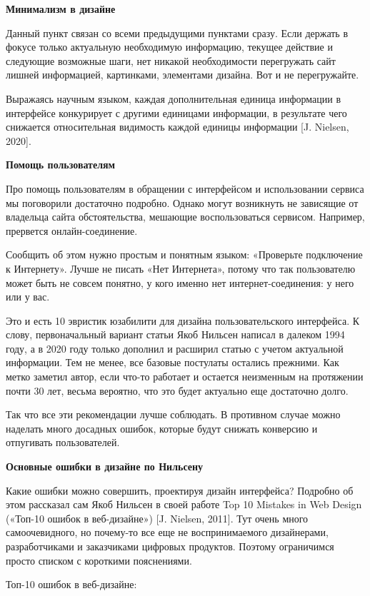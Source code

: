 \textbf{Минимализм в дизайне}

Данный пункт связан со всеми предыдущими пунктами сразу. Если держать в фокусе только актуальную необходимую информацию, текущее действие и следующие возможные шаги, нет никакой необходимости перегружать сайт лишней информацией, картинками, элементами дизайна. Вот и не перегружайте.

Выражаясь научным языком, каждая дополнительная единица информации в интерфейсе конкурирует с другими единицами информации, в результате чего снижается относительная видимость каждой единицы информации [J. Nielsen, 2020].


\textbf{Помощь пользователям}

Про помощь пользователям в обращении с интерфейсом и использовании сервиса мы поговорили достаточно подробно. Однако могут возникнуть не зависящие от владельца сайта обстоятельства, мешающие воспользоваться сервисом. Например, прервется онлайн-соединение.

Сообщить об этом нужно простым и понятным языком: «Проверьте подключение к Интернету». Лучше не писать «Нет Интернета», потому что так пользователю может быть не совсем понятно, у кого именно нет интернет-соединения: у него или у вас.

Это и есть 10 эвристик юзабилити для дизайна пользовательского интерфейса. К слову, первоначальный вариант статьи Якоб Нильсен написал в далеком 1994 году, а в 2020 году только дополнил и расширил статью с учетом актуальной информации. Тем не менее, все базовые постулаты остались прежними. Как метко заметил автор, если что-то работает и остается неизменным на протяжении почти 30 лет, весьма вероятно, что это будет актуально еще достаточно долго.

Так что все эти рекомендации лучше соблюдать. В противном случае можно наделать много досадных ошибок, которые будут снижать конверсию и отпугивать пользователей.

\textbf{Основные ошибки в дизайне по Нильсену}

Какие ошибки можно совершить, проектируя дизайн интерфейса? Подробно об этом рассказал сам Якоб Нильсен в своей работе Top 10 Mistakes in Web Design («Топ-10 ошибок в веб-дизайне») [J. Nielsen, 2011]. Тут очень много самоочевидного, но почему-то все еще не воспринимаемого дизайнерами, разработчиками и заказчиками цифровых продуктов. Поэтому ограничимся просто списком с короткими пояснениями.

Топ-10 ошибок в веб-дизайне:

